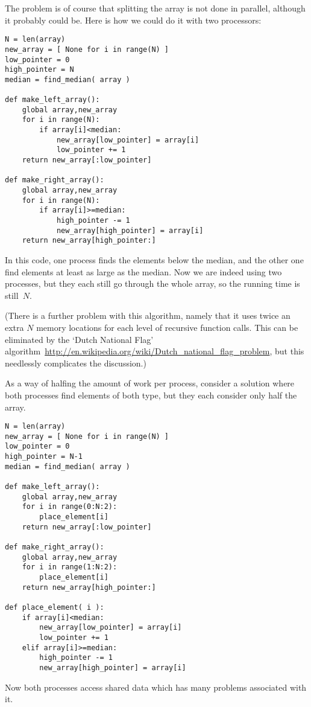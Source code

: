 The problem is of course that splitting the array is not done in parallel,
although it probably could be. Here is how we could do it with two processors:
\begin{verbatim}
N = len(array)
new_array = [ None for i in range(N) ]
low_pointer = 0
high_pointer = N
median = find_median( array )

def make_left_array():
    global array,new_array
    for i in range(N):
        if array[i]<median:
            new_array[low_pointer] = array[i]
            low_pointer += 1
    return new_array[:low_pointer]

def make_right_array():
    global array,new_array
    for i in range(N):
        if array[i]>=median:
            high_pointer -= 1
            new_array[high_pointer] = array[i]
    return new_array[high_pointer:]
\end{verbatim}
In this code, one process finds the elements below the median, and the other one
find elements at least as large as the median.
Now we are indeed using two processes, but they each still go through the whole array,
so the running time is still~$N$.

(There is a further problem with this algorithm, namely that it uses
twice an extra $N$ memory locations for each level of recursive
function calls. This can be eliminated by the `Dutch National Flag'
algorithm~\url{http://en.wikipedia.org/wiki/Dutch_national_flag_problem},
but this needlessly complicates the discussion.)

As a way of halfing the amount of work per process, consider
a solution where both processes find elements of both type, but they 
each consider only half the array.
\begin{verbatim}
N = len(array)
new_array = [ None for i in range(N) ]
low_pointer = 0
high_pointer = N-1
median = find_median( array )

def make_left_array():
    global array,new_array
    for i in range(0:N:2):
        place_element[i]
    return new_array[:low_pointer]

def make_right_array():
    global array,new_array
    for i in range(1:N:2):
        place_element[i]
    return new_array[high_pointer:]

def place_element( i ):
    if array[i]<median:
        new_array[low_pointer] = array[i]
        low_pointer += 1
    elif array[i]>=median:
        high_pointer -= 1
        new_array[high_pointer] = array[i]
\end{verbatim}
Now both processes access shared data which has many problems associated with it.

